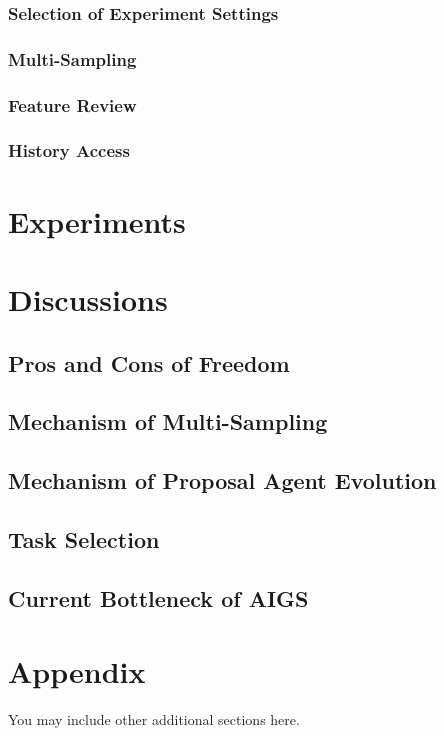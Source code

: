 \documentclass{article} %
\begin{document}
\subsubsection{Selection of Experiment Settings}

\subsubsection{Multi-Sampling}

\subsubsection{Feature Review}

\subsubsection{History Access}

\section{Experiments}

\section{Discussions}

\subsection{Pros and Cons of Freedom}

\subsection{Mechanism of Multi-Sampling}

\subsection{Mechanism of Proposal Agent Evolution}

\subsection{Task Selection}

\subsection{Current Bottleneck of AIGS}






\appendix
\section{Appendix}
You may include other additional sections here.
\end{document}

